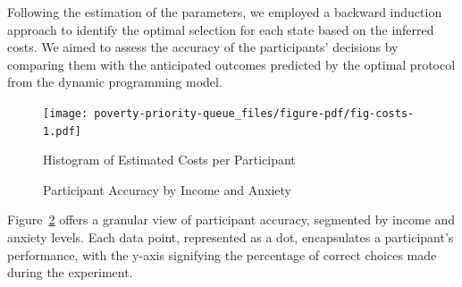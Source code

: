 \documentclass[
]{article}
\begin{document}
Following the estimation of the parameters, we employed a backward
induction approach to identify the optimal selection for each state
based on the inferred costs. We aimed to assess the accuracy of the
participants' decisions by comparing them with the anticipated outcomes
predicted by the optimal protocol from the dynamic programming model.

\begin{figure}

{\centering \texttt{[image: poverty-priority-queue\_files/figure-pdf/fig-costs-1.pdf]}

}

\caption{\label{fig-costs}Histogram of Estimated Costs per Participant}

\end{figure}

\begin{figure}

\begin{minipage}[t]{0.50\linewidth}

{\centering 


}

\end{minipage}%
%
\begin{minipage}[t]{0.50\linewidth}

{\centering 


}

\end{minipage}%

\caption{\label{fig-accuracy-results}Participant Accuracy by Income and
Anxiety}

\end{figure}

Figure~\ref{fig-accuracy-results} offers a granular view of participant
accuracy, segmented by income and anxiety levels. Each data point,
represented as a dot, encapsulates a participant's performance, with the
y-axis signifying the percentage of correct choices made during the
experiment.
\end{document}
